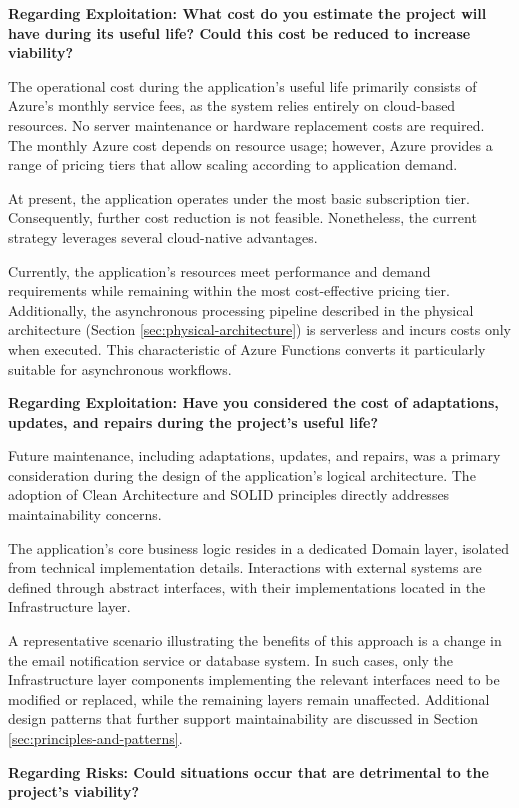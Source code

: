 \textbf{Regarding Exploitation: What cost do you estimate the project will have during its useful life? Could this cost be reduced to increase viability?}

The operational cost during the application's useful life primarily consists of Azure's monthly service fees, as the system relies entirely on cloud-based resources. No server maintenance or hardware replacement costs are required. The monthly Azure cost depends on resource usage; however, Azure provides a range of pricing tiers that allow scaling according to application demand.

At present, the application operates under the most basic subscription tier. Consequently, further cost reduction is not feasible. Nonetheless, the current strategy leverages several cloud-native advantages.

Currently, the application's resources meet performance and demand requirements while remaining within the most cost-effective pricing tier. Additionally, the asynchronous processing pipeline described in the physical architecture (Section \ref{sec:physical-architecture}) is serverless and incurs costs only when executed. This characteristic of Azure Functions converts it particularly suitable for asynchronous workflows.

\textbf{Regarding Exploitation: Have you considered the cost of adaptations, updates, and repairs during the project's useful life?}

Future maintenance, including adaptations, updates, and repairs, was a primary consideration during the design of the application's logical architecture. The adoption of Clean Architecture and SOLID principles directly addresses maintainability concerns.

The application's core business logic resides in a dedicated Domain layer, isolated from technical implementation details. Interactions with external systems are defined through abstract interfaces, with their implementations located in the Infrastructure layer.

\newpage
A representative scenario illustrating the benefits of this approach is a change in the email notification service or database system. In such cases, only the Infrastructure layer components implementing the relevant interfaces need to be modified or replaced, while the remaining layers remain unaffected. Additional design patterns that further support maintainability are discussed in Section \ref{sec:principles-and-patterns}.   

\textbf{Regarding Risks: Could situations occur that are detrimental to the project's viability?}

